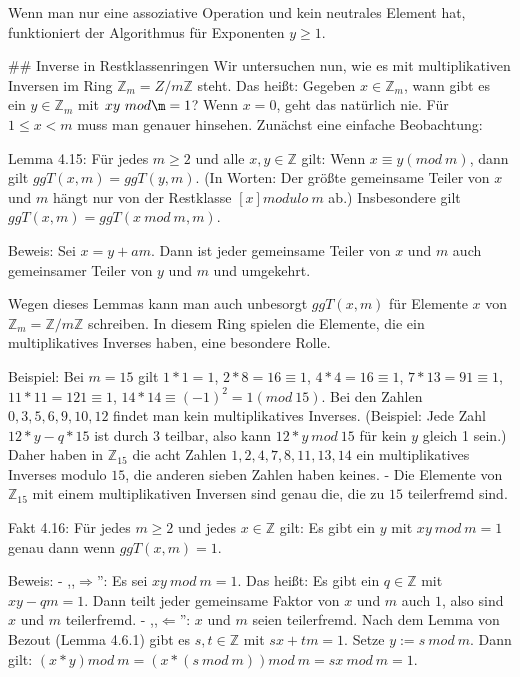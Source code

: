 \documentclass[a4paper]{article}
\begin{document}
\begin{multicols}{3}
Wenn man nur eine assoziative Operation und kein neutrales Element hat, funktioniert der Algorithmus für Exponenten $y\geq 1$.

## Inverse in Restklassenringen
Wir untersuchen nun, wie es mit multiplikativen Inversen im Ring $\mathbb{Z}_m =Z/m\mathbb{Z}$ steht. Das heißt: Gegeben $x\in\mathbb{Z}_m$, wann gibt es ein $y\in\mathbb{Z}_m$ mit $xy\ mod\m= 1$? Wenn $x=0$, geht das natürlich nie. Für $1\leq x<m$ muss man genauer hinsehen.
Zunächst eine einfache Beobachtung:

Lemma 4.15: Für jedes $m\geq 2$ und alle $x,y\in\mathbb{Z}$ gilt: Wenn $x\equiv y(mod\ m)$, dann gilt $ggT(x,m)=ggT(y,m)$. (In Worten: Der größte gemeinsame Teiler von $x$ und $m$ hängt nur von der Restklasse $[x] modulo\ m$ ab.) Insbesondere gilt $ggT(x,m) = ggT(x\ mod\ m,m)$.

Beweis: Sei $x=y+am$. Dann ist jeder gemeinsame Teiler von $x$ und $m$ auch gemeinsamer Teiler von $y$ und $m$ und umgekehrt. 

Wegen dieses Lemmas kann man auch unbesorgt $ggT(x,m)$ für Elemente $x$ von $\mathbb{Z}_m =\mathbb{Z}/m\mathbb{Z}$ schreiben. In diesem Ring spielen die Elemente, die ein multiplikatives Inverses haben, eine besondere Rolle.

Beispiel: Bei $m=15$ gilt $1*1=1$, $2*8 = 16\equiv 1$, $4*4 = 16\equiv 1$, $7*13 = 91\equiv 1$, $11*11 = 121\equiv 1$, $14* 14 \equiv (-1)^2 = 1 (mod\ 15)$. Bei den Zahlen $0, 3 , 5 , 6 , 9 , 10 , 12$ findet man kein multiplikatives Inverses. (Beispiel: Jede Zahl $12*y-q*15$ ist durch $3$ teilbar, also kann $12*y\ mod\ 15$ für kein $y$ gleich 1 sein.) Daher haben in $\mathbb{Z}_{15}$ die acht Zahlen $1, 2, 4, 7, 8, 11, 13, 14$ ein multiplikatives Inverses modulo $15$, die anderen sieben Zahlen haben keines. - Die Elemente von $\mathbb{Z}_{15}$ mit einem multiplikativen Inversen sind genau die, die zu $15$ teilerfremd sind.

Fakt 4.16: Für jedes $m\geq 2$ und jedes $x\in\mathbb{Z}$ gilt: Es gibt ein $y$ mit $xy\ mod\ m=1$ genau dann wenn $ggT(x,m)=1$.

Beweis: 
- ,,$\Rightarrow$'': Es sei $xy\ mod\ m= 1$. Das heißt: Es gibt ein $q\in\mathbb{Z}$ mit $xy-qm=1$. Dann teilt jeder gemeinsame Faktor von $x$ und $m$ auch $1$, also sind $x$ und $m$ teilerfremd.
- ,,$\Leftarrow$'': $x$ und $m$ seien teilerfremd. Nach dem Lemma von Bezout (Lemma 4.6.1) gibt es $s,t\in\mathbb{Z}$ mit $sx+tm=1$. Setze $y:=s\ mod\ m$. Dann gilt: $(x*y) mod\ m= (x*(s\ mod\ m)) mod\ m=sx\ mod\ m= 1$.


\end{multicols}
\end{document}
